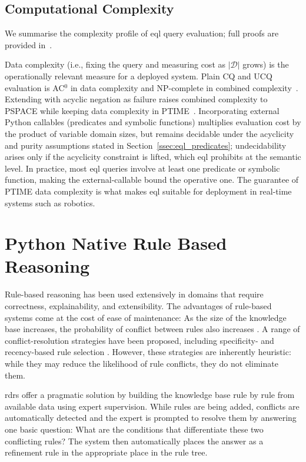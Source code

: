 \documentclass[a4paper,fleqn]{cas-sc}
\begin{document}
\subsection{Computational Complexity}
\label{ssec:eql_complexity}

We summarise the complexity profile of \ac{eql} query evaluation; full proofs
are provided in~\citep{EQLFormalization2026}.

Data complexity (i.e., fixing the query and measuring cost as $|\mathcal{D}|$
grows) is the operationally relevant measure for a deployed system. Plain CQ
and UCQ evaluation is AC$^0$ in data complexity and NP-complete in combined
complexity~\citep{ChandraMerlin1977,Vardi1982,AbiteboulHullVianu1995}. Extending
with acyclic negation as failure raises combined complexity to PSPACE while
keeping data complexity in PTIME~\citep{AptBlairWalker1988}. Incorporating
external Python callables (predicates and symbolic functions) multiplies
evaluation cost by the product of variable domain sizes, but remains decidable
under the acyclicity and purity assumptions stated in
Section~\ref{ssec:eql_predicates}; undecidability arises only if the acyclicity
constraint is lifted, which \ac{eql} prohibits at the semantic level. In
practice, most \ac{eql} queries involve at least one predicate or symbolic
function, making the external-callable bound the operative one. The guarantee
of PTIME data complexity is what makes \ac{eql} suitable for deployment in
real-time systems such as robotics.

\section{Python Native Rule Based Reasoning}
\label{sec:rdrs}
Rule-based reasoning has been used extensively in domains that require correctness, explainability, and extensibility. The advantages of rule-based systems come at the cost of ease of maintenance: As the size of the knowledge base increases, the probability of conflict between rules also increases \citep{compton2021rdr}. A range of conflict-resolution strategies have been proposed, including specificity- and recency-based rule selection \citep{brachman2004knowledge}. However, these strategies are inherently heuristic: while they may reduce the likelihood of rule conflicts, they do not eliminate them.

\ac{rdr}s \citep{compton2021rdr} offer a pragmatic solution by building the knowledge base rule by rule from available data using expert supervision. While rules are being added, conflicts are automatically detected and the expert is prompted to resolve them by answering one basic question: What are the conditions that differentiate these two conflicting rules? The system then automatically places the answer as a refinement rule in the appropriate place in the rule tree.
\end{document}
